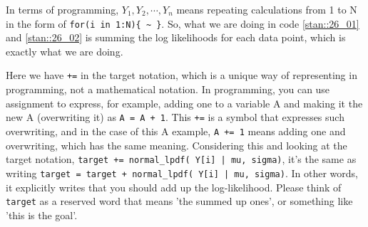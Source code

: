 \documentclass{ltjsbook}
\begin{document}
	In terms of programming, $Y_1,Y_2,\cdots,Y_n$ means repeating calculations from 1 to N in the form of \verb|for(i in 1:N){ ~ }|. So, what we are doing in code \ref{stan::26_01} and \ref{stan::26_02} is summing the log likelihoods for each data point, which is exactly what we are doing.

	Here we have \verb|+=| in the target notation, which is a unique way of representing in programming, not a mathematical notation. In programming, you can use assignment to express, for example, adding one to a variable A and making it the new A (overwriting it) as \verb|A = A + 1|. This \verb|+=| is a symbol that expresses such overwriting, and in the case of this A example, \verb|A += 1| means adding one and overwriting, which has the same meaning.
	Considering this and looking at the target notation, \verb#target += normal_lpdf( Y[i] | mu, sigma)#, it's the same as writing \verb#target = target + normal_lpdf( Y[i] | mu, sigma)#. In other words, it explicitly writes that you should add up the log-likelihood. Please think of \verb|target| as a reserved word that means 'the summed up ones', or something like 'this is the goal'.
\end{document}
